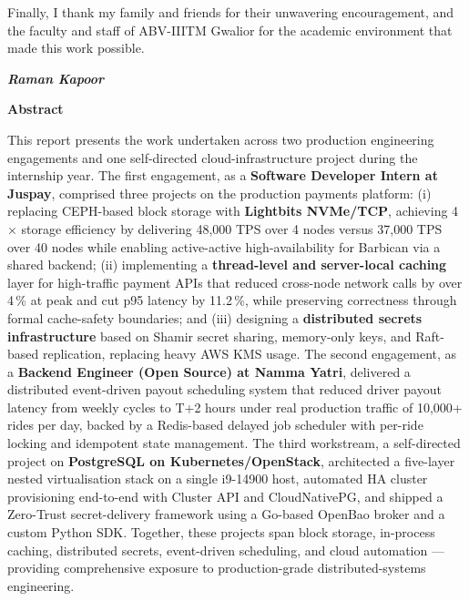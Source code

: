 \documentclass[12pt,a4paper,oneside]{report}
\begin{document}
Finally, I thank my family and friends for their unwavering encouragement, and the faculty and staff of ABV-IIITM Gwalior for the academic environment that made this work possible.

\begin{flushright}
\textit{\textbf{Raman Kapoor}}
\end{flushright}
\clearpage

\thispagestyle{empty}
\begin{center}
{\Large\bf Abstract}
\end{center}
\noindent This report presents the work undertaken across two production engineering engagements and one self-directed cloud-infrastructure project during the internship year. The first engagement, as a \textbf{Software Developer Intern at Juspay}, comprised three projects on the production payments platform: (i) replacing CEPH-based block storage with \textbf{Lightbits NVMe/TCP}, achieving 4$\times$ storage efficiency by delivering 48{,}000 TPS over 4 nodes versus 37{,}000 TPS over 40 nodes while enabling active-active high-availability for Barbican via a shared backend; (ii) implementing a \textbf{thread-level and server-local caching} layer for high-traffic payment APIs that reduced cross-node network calls by over 4\,\% at peak and cut p95 latency by 11.2\,\%, while preserving correctness through formal cache-safety boundaries; and (iii) designing a \textbf{distributed secrets infrastructure} based on Shamir secret sharing, memory-only keys, and Raft-based replication, replacing heavy AWS KMS usage. The second engagement, as a \textbf{Backend Engineer (Open Source) at Namma Yatri}, delivered a distributed event-driven payout scheduling system that reduced driver payout latency from weekly cycles to T+2 hours under real production traffic of 10{,}000+ rides per day, backed by a Redis-based delayed job scheduler with per-ride locking and idempotent state management. The third workstream, a self-directed project on \textbf{PostgreSQL on Kubernetes/OpenStack}, architected a five-layer nested virtualisation stack on a single i9-14900 host, automated HA cluster provisioning end-to-end with Cluster API and CloudNativePG, and shipped a Zero-Trust secret-delivery framework using a Go-based OpenBao broker and a custom Python SDK. Together, these projects span block storage, in-process caching, distributed secrets, event-driven scheduling, and cloud automation --- providing comprehensive exposure to production-grade distributed-systems engineering.
\clearpage
\end{document}
